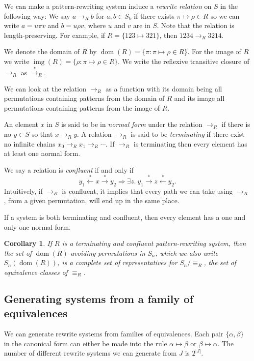 \documentclass[a4paper, 11pt, english]{article}
\newcommand{\patternrule}{ \mapsto \!}
\newtheorem{corollary}[theorem]{Corollary}
\theoremstyle{definition}
\newcommand{\Sym}{S}
\newcommand{\from}{\leftarrow}
\newcommand{\tostar}{\stackrel{*}{\to}}
\newcommand{\fromstar}{\stackrel{*}{\from}}
\DeclareMathOperator{\dom}{dom}
\DeclareMathOperator{\img}{img}
\begin{document}
We can make a pattern-rewriting system induce a \emph{rewrite relation} on $\Sym$ in the following way: We say
$a \to_R b$ for $a, b \in \Sym_k$ if there exists $\pi \patternrule \rho \in R$ so
we can write $a = u \pi v$ and $b = u \rho v$, where
$u$ and $v$ are in $\Sym$.  Note that the relation is
length-preserving. For example, if $R = \{123 \patternrule 321\}$, then $1234 \to_R 3214$. 

We denote the domain of $R$ by $\dom(R) = \{\pi : \pi \patternrule
\rho \in R\}$. For the image of $R$ we write $\img(R) = \{\rho : \pi
\patternrule \rho \in R\}$. We write the reflexive transitive closure of
$\to_R$ as $\tostar_R$. 

We can look at the relation $\to_R$ as a function with its domain being all permutations containing
patterns from the domain of $R$ and its image all permutations containing patterns from the image of
$R$.

An element $x$ in $\Sym$ is said to be in \emph{normal form} under the relation $\to_R$
if there is no $y \in \Sym$ so that $x \to_R y$. A relation $\to_R$ is said to be
\emph{terminating} if there exist no infinite chains $x_0 \to_R x_1 \to_R \cdots$. If
$\to_R$ is terminating then every element has at least one normal form. 

We say a relation is \emph{confluent} if and only if
$$
    y_1 \fromstar x \tostar y_2 \Longrightarrow 
    \exists z. \  y_1 \tostar z \fromstar y_2.
$$
Intuitively, if $\to_R$ is confluent, it implies that every path we can
take using $\to_R$, from a given permutation, will end up in the same place. 

If a system is both terminating and confluent, then every element has a one and
only one normal form.

\begin{corollary}
    If $R$ is a terminating and confluent pattern-rewriting system, then the set of
    $\dom(R)$-avoiding permutations in $S_n$, which we also write $S_n(\dom(R))$, is a complete set of
    representatives for $S_n / \equiv_R$, the set of equivalence classes of $\equiv_R$.
\end{corollary}

\subsection{Generating systems from a family of equivalences}

We can generate rewrite systems from families of equivalences. Each pair $\{\alpha, \beta \}$ in the
canonical form can either be made into the rule $\alpha \patternrule \beta$ or $\beta \patternrule
\alpha$. The number of different rewrite systems we can generate from $J$ is $2^{|J|}$.
\end{document}
